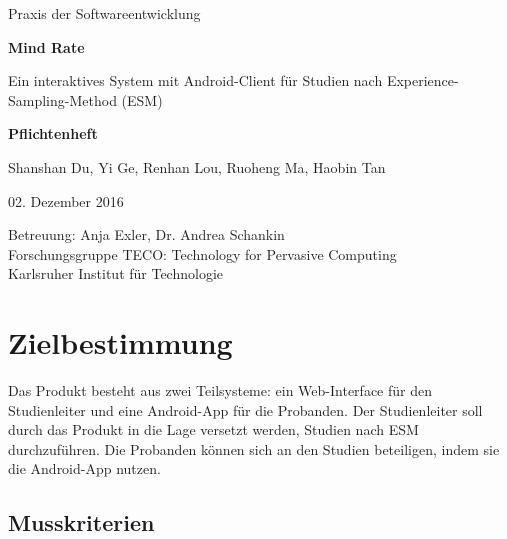 \documentclass[a4paper]{scrreprt}
\begin{document}
    \begin{center} \large

        Praxis der Softwareentwicklung
        \vspace * {1.5cm}

        \textbf{\huge Mind Rate}

        \vspace*{1cm}


        {\Large Ein interaktives System mit Android-Client f\"ur Studien nach Experience-Sampling-Method (ESM)}

        \vspace*{1cm}

        \textbf{\Large Pflichtenheft}
        \vspace*{2cm}

        Shanshan Du, Yi Ge, Renhan Lou, Ruoheng Ma, Haobin Tan
        \vspace*{1cm}

        02. Dezember 2016
        \vspace*{2.5cm}

        Betreuung: Anja Exler, Dr. Andrea Schankin\\[0.5cm]
        Forschungsgruppe TECO: Technology for Pervasive Computing\\[0.5cm]

        Karlsruher Institut für Technologie
    \end{center}
    \thispagestyle{empty}

    \tableofcontents

    \chapter{Zielbestimmung}

        \noindent Das Produkt besteht aus zwei Teilsysteme: ein \gls{Web-Interface} für den \gls{Studienleiter} und eine \gls{Android-App} für die \gls{Proband}en. Der \gls{Studienleiter} soll durch das Produkt in die Lage versetzt werden, Studien nach ESM durchzuf\"uhren. Die Probanden k\"onnen sich an den Studien beteiligen, indem sie die \gls{Android-App} nutzen.


        \section{Musskriterien}
\end{document}

